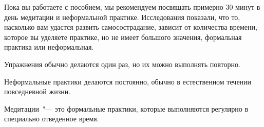 	Пока вы работаете с пособием, мы рекомендуем посвящать примерно 30 минут в день медитации и неформальной практике. Исследования показали, что то, насколько вам удастся развить самосострадание, зависит от количества времени, которое вы уделяете практике, но не имеет большого значения, формальная практика или неформальная.  
	
	Упражнения обычно делаются один раз, но их можно выполнять повторно.
	
	Неформальные практики делаются постоянно, обычно в естественном течении повседневной жизни.
	
	Медитации~"--- это формальные практики, которые выполняются регулярно в специально отведенное время. 
